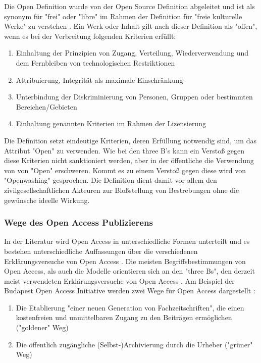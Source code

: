Die Open Definition wurde von der Open Source Definition abgeleitet und ist als synonym für "frei" oder "libre" im Rahmen der Definition für "freie kulturelle Werke" zu verstehen \cite{suchen}. Ein Werk oder Inhalt gilt nach dieser Definition als "offen", wenn es bei der Verbreitung folgenden Kriterien erfüllt:
\begin{enumerate}
\item Einhaltung der Prinzipien von Zugang, Verteilung, Wiederverwendung und dem Fernbleiben von technologischen Restriktionen
\item Attribuierung, Integrität als maximale Einschränkung
\item Unterbindung der Diskriminierung von Personen, Gruppen oder bestimmten Bereichen/Gebieten
\item Einhaltung genannten Kriterien  im Rahmen der Lizensierung
\end{enumerate}

Die Definition setzt eindeutige Kriterien, deren Erfüllung notwendig sind, um das Attribut "Open" zu verwenden. Wie bei den three B's kann ein Verstoß gegen diese Kriterien nicht sanktioniert werden, aber in der öffentliche die Verwendung von von "Open" erschweren. Kommt es zu einem Verstoß gegen diese wird von "Openwashing" gesprochen. Die Definition dient damit vor allem den zivilgesellschaftlichen Akteuren zur Bloßstellung von Bestrebungen ohne die gewünsche ideelle Wirkung.

\subsubsection{Wege des Open Access Publizierens}

In der Literatur wird Open Access in unterschiedliche Formen unterteilt \cite{CREATe_2014} \cite{albert_2006_open_implications} und es bestehen unterschiedliche Auffassungen über die verschiedenen Erklärungsversuche von Open Access \cite{CREATe_2014} \cite{cite:22b} \cite{lewis_2012_inevitability}. Die meisten Begriffsbestimmungen von Open Access, als auch die Modelle orientieren sich an den "three Bs", den derzeit meist verwendeten Erklärungsversuche von Open Access \cite{Adema_2014_open_access}. Am Beispiel der Budapest Open Access Initiative werden zwei Wege für Open Access dargestellt \cite{albert_2006_open_implications}:
\begin{enumerate}
\item Die Etablierung "einer neuen Generation von Fachzeitschriften", die einen kostenfreien und unmittelbaren Zugang zu den Beiträgen ermöglichen ("goldener" Weg)
\item Die öffentlich zugängliche (Selbst-)Archivierung durch die Urheber ("grüner" Weg) \cite{adema_2013_political} \cite{hall_2008_digitize}
\end{enumerate}

